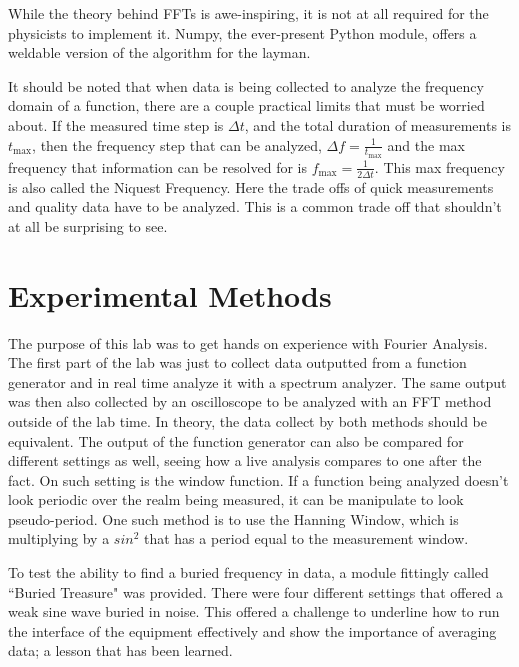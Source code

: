 \documentclass[12pt]{article}
\begin{document}
While the theory behind FFTs is awe-inspiring, it is not at all required for the physicists to implement it. Numpy, the ever-present Python module, offers a weldable version of the algorithm for the layman.

It should be noted that when data is being collected to analyze the frequency domain of a function, there are a couple practical limits that must be worried about. If the measured time step is $\Delta t$, and the total duration of measurements is $t_{\text{max}}$, then the frequency step that can be analyzed, $\Delta f = \frac{1}{t_{\text{max}}}$ and the max frequency that information can be resolved for is $f_{\text{max}} = \frac{1}{2 \Delta t}$. This max frequency is also called the Niquest Frequency. Here the trade offs of quick measurements and quality data have to be analyzed. This is a common trade off that shouldn't at all be surprising to see.

\section{Experimental Methods}

The purpose of this lab was to get hands on experience with Fourier Analysis. The first part of the lab was just to collect data outputted from a function generator and in real time analyze it with a spectrum analyzer. The same output was then also collected by an oscilloscope to be analyzed with an FFT method outside of the lab time. In theory, the data collect by both methods should be equivalent. The output of the function generator can also be compared for different settings as well, seeing how a live analysis compares to one after the fact. On such setting is the window function. If a function being analyzed doesn't look periodic over the realm being measured, it can be manipulate to look pseudo-period. One such method is to use the Hanning Window, which is multiplying by a $sin^2$ that has a period equal to the measurement window. 

To test the ability to find a buried frequency in data, a module fittingly called ``Buried Treasure" was provided. There were four different settings that offered a weak sine wave buried in noise. This offered a challenge to underline how to run the interface of the equipment effectively and show the importance of averaging data; a lesson that has been learned.
\end{document}
